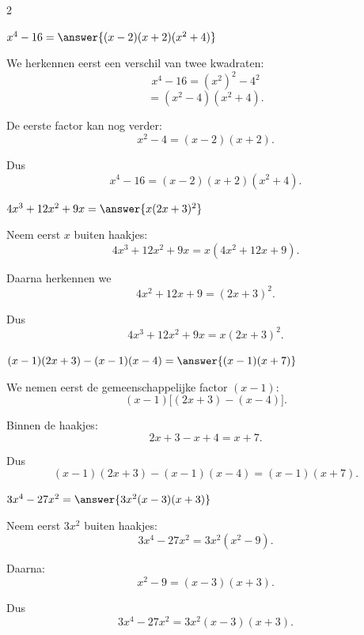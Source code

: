 \documentclass{ximera}
\begin{document}
\begin{oefening}{\oefU\ESS}
\begin{multicols}{2}
    
    \begin{question}
    $x^4-16=\answer{(x-2)(x+2)(x^2+4)}$
    
    \begin{oplossing}
    We herkennen eerst een verschil van twee kwadraten:
    \[
    x^4-16
    =(x^2)^2-4^2
    \]
    \[
    =(x^2-4)(x^2+4).
    \]
    
    De eerste factor kan nog verder:
    \[
    x^2-4=(x-2)(x+2).
    \]
    
    Dus
    \[
    x^4-16
    =(x-2)(x+2)(x^2+4).
    \]
    \end{oplossing}
    \end{question}
    
    
    \begin{question}
    $4x^3+12x^2+9x
    =\answer{x(2x+3)^2}$
    
    \begin{oplossing}
    Neem eerst $x$ buiten haakjes:
    \[
    4x^3+12x^2+9x
    =x(4x^2+12x+9).
    \]
    
    Daarna herkennen we
    \[
    4x^2+12x+9=(2x+3)^2.
    \]
    
    Dus
    \[
    4x^3+12x^2+9x
    =x(2x+3)^2.
    \]
    \end{oplossing}
    \end{question}
    
    
    \begin{question}
    $(x-1)(2x+3)-(x-1)(x-4)
    =\answer{(x-1)(x+7)}$
    
    \begin{oplossing}
    We nemen eerst de gemeenschappelijke factor $(x-1)$:
    \[
    (x-1)\bigl[(2x+3)-(x-4)\bigr].
    \]
    
    Binnen de haakjes:
    \[
    2x+3-x+4=x+7.
    \]
    
    Dus
    \[
    (x-1)(2x+3)-(x-1)(x-4)
    =(x-1)(x+7).
    \]
    \end{oplossing}
    \end{question}
    
    
    \begin{question}
    $3x^4-27x^2
    =\answer{3x^2(x-3)(x+3)}$
    
    \begin{oplossing}
    Neem eerst $3x^2$ buiten haakjes:
    \[
    3x^4-27x^2
    =3x^2(x^2-9).
    \]
    
    Daarna:
    \[
    x^2-9=(x-3)(x+3).
    \]
    
    Dus
    \[
    3x^4-27x^2
    =3x^2(x-3)(x+3).
    \]
    \end{oplossing}
    \end{question}
    
    \end{multicols}
    
    \end{oefening}
\end{document}
